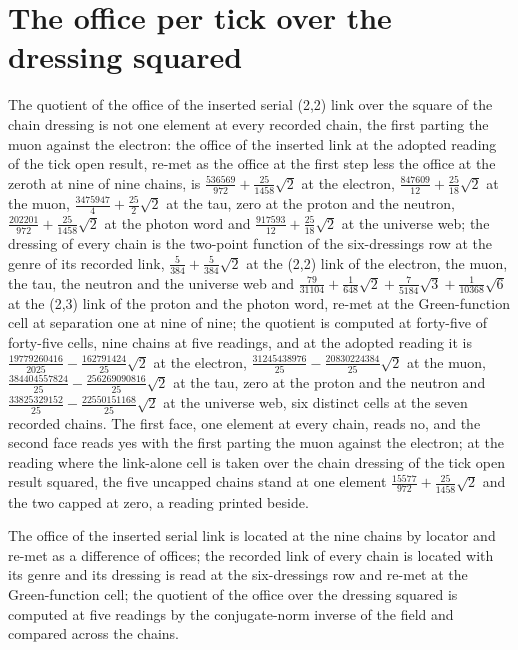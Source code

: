 \section{The office per tick over the dressing squared}\label{mod:III-1-D543820-w-tkud}
\begin{chwall}\label{box:III-1-D543820-w-tkud:1}
The quotient of the office of the inserted serial (2,2) link over the square of the chain dressing is not one element at every recorded chain, the first parting the muon against the electron: the office of the inserted link at the adopted reading of the tick open result, re-met as the office at the first step less the office at the zeroth at nine of nine chains, is $\tfrac{536569}{972} + \tfrac{25}{1458}\sqrt{2}$ at the electron, $\tfrac{847609}{12} + \tfrac{25}{18}\sqrt{2}$ at the muon, $\tfrac{3475947}{4} + \tfrac{25}{2}\sqrt{2}$ at the tau, zero at the proton and the neutron, $\tfrac{202201}{972} + \tfrac{25}{1458}\sqrt{2}$ at the photon word and $\tfrac{917593}{12} + \tfrac{25}{18}\sqrt{2}$ at the universe web; the dressing of every chain is the two-point function of the six-dressings row at the genre of its recorded link, $\tfrac{5}{384} + \tfrac{5}{384}\sqrt{2}$ at the (2,2) link of the electron, the muon, the tau, the neutron and the universe web and $\tfrac{79}{31104} + \tfrac{1}{648}\sqrt{2} + \tfrac{7}{5184}\sqrt{3} + \tfrac{1}{10368}\sqrt{6}$ at the (2,3) link of the proton and the photon word, re-met at the Green-function cell at separation one at nine of nine; the quotient is computed at forty-five of forty-five cells, nine chains at five readings, and at the adopted reading it is $\tfrac{19779260416}{2025} - \tfrac{162791424}{25}\sqrt{2}$ at the electron, $\tfrac{31245438976}{25} - \tfrac{20830224384}{25}\sqrt{2}$ at the muon, $\tfrac{384404557824}{25} - \tfrac{256269090816}{25}\sqrt{2}$ at the tau, zero at the proton and the neutron and $\tfrac{33825329152}{25} - \tfrac{22550151168}{25}\sqrt{2}$ at the universe web, six distinct cells at the seven recorded chains. The first face, one element at every chain, reads no, and the second face reads yes with the first parting the muon against the electron; at the reading where the link-alone cell is taken over the chain dressing of the tick open result squared, the five uncapped chains stand at one element $\tfrac{15577}{972} + \tfrac{25}{1458}\sqrt{2}$ and the two capped at zero, a reading printed beside.
\end{chwall}
The office of the inserted serial link is located at the nine chains by locator and re-met as a difference of offices; the recorded link of every chain is located with its genre and its dressing is read at the six-dressings row and re-met at the Green-function cell; the quotient of the office over the dressing squared is computed at five readings by the conjugate-norm inverse of the field and compared across the chains.

